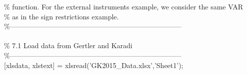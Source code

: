 \hspace{1mm}\hspace{5mm} \hspace{5mm} \hspace{5mm} \hspace{5mm} \textcolor{matlabgreen}{\% function. For the external instruments example, we consider the same VAR  }\\ 
\hspace{1mm}\hspace{5mm} \hspace{5mm} \hspace{5mm} \hspace{5mm} \textcolor{matlabgreen}{\% as in the sign restrictions example.  }\\ 
\hspace{1mm}\hspace{5mm} \hspace{5mm} \hspace{5mm} \hspace{5mm} \textcolor{matlabgreen}{\%--------------------------------------------------------------------------  }\\ 
\hspace{1mm}\hspace{5mm} \hspace{5mm} \hspace{5mm} \hspace{5mm}  \\ 
\hspace{1mm}\hspace{5mm} \hspace{5mm} \hspace{5mm} \hspace{5mm} \textcolor{matlabgreen}{\% 7.1 Load data from Gertler and Karadi }\\ 
\hspace{1mm}\hspace{5mm} \hspace{5mm} \hspace{5mm} \hspace{5mm} \textcolor{matlabgreen}{\%--------------------------------------------------------------------------  }\\ 
\hspace{1mm}\hspace{5mm} \hspace{5mm} \hspace{5mm} \hspace{5mm} [xlsdata, xlstext] = xlsread(\textcolor{matlabpurple}{'GK2015\_Data.xlsx'},\textcolor{matlabpurple}{'Sheet1'}); \\ 
